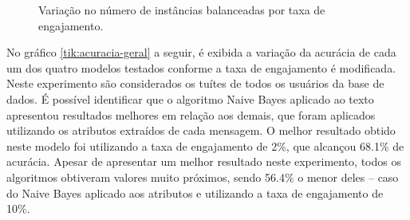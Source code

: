 \documentclass[oneside,openright,12pt]{ufsm_2015} %
\begin{document}
    \begin{figure}[!ht]
    \caption{Variação no número de instâncias balanceadas por taxa de engajamento.}
    \centering
    \label{tik:engaj-balanc}
    \end{figure}
    
    \par No gráfico \ref{tik:acuracia-geral} a seguir, é exibida a variação da acurácia de cada um dos quatro modelos testados conforme a taxa de engajamento é modificada. Neste experimento são considerados os tuítes de todos os usuários da base de dados. É possível identificar que o algoritmo Naive Bayes aplicado ao texto apresentou resultados melhores em relação aos demais, que foram aplicados utilizando os atributos extraídos de cada mensagem. O melhor resultado obtido neste modelo foi utilizando a taxa de engajamento de 2\%, que alcançou 68.1\% de acurácia. Apesar de apresentar um melhor resultado neste experimento, todos os algoritmos obtiveram valores muito próximos, sendo 56.4\% o menor deles -- caso do Naive Bayes aplicado aos atributos e utilizando a taxa de engajamento de 10\%.
    
    \mydata
    
\end{document}
